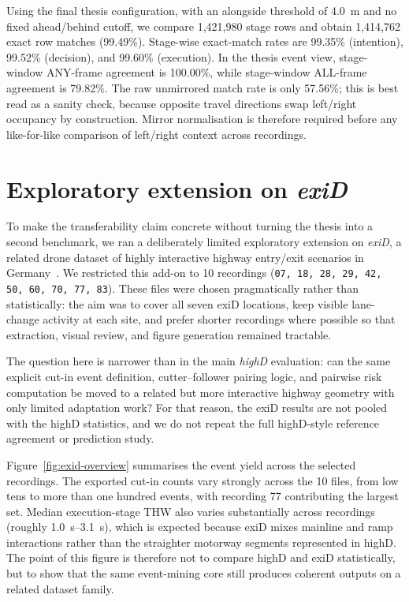 \documentclass[12pt,a4paper,twoside,openright]{report}
\begin{document}
    Using the final thesis configuration, with an alongside threshold of \SI{4.0}{\meter} and no fixed ahead/behind cutoff, we compare 1,421,980 stage rows and obtain 1,414,762 exact row matches (99.49\%). Stage-wise exact-match rates are 99.35\% (intention), 99.52\% (decision), and 99.60\% (execution). In the thesis event view, stage-window ANY-frame agreement is 100.00\%, while stage-window ALL-frame agreement is 79.82\%. The raw unmirrored match rate is only 57.56\%; this is best read as a sanity check, because opposite travel directions swap left/right occupancy by construction. Mirror normalisation is therefore required before any like-for-like comparison of left/right context across recordings.
    \section{Exploratory extension on \textit{exiD}}
    \label{sec:exid-exploratory}
    To make the transferability claim concrete without turning the thesis into a second benchmark, we ran a deliberately limited exploratory extension on \textit{exiD}, a related drone dataset of highly interactive highway entry/exit scenarios in Germany~\cite{moers2022exid}. We restricted this add-on to 10 recordings (\texttt{07, 18, 28, 29, 42, 50, 60, 70, 77, 83}). These files were chosen pragmatically rather than statistically: the aim was to cover all seven exiD locations, keep visible lane-change activity at each site, and prefer shorter recordings where possible so that extraction, visual review, and figure generation remained tractable.

    The question here is narrower than in the main \textit{highD} evaluation: can the same explicit cut-in event definition, cutter--follower pairing logic, and pairwise risk computation be moved to a related but more interactive highway geometry with only limited adaptation work? For that reason, the exiD results are not pooled with the highD statistics, and we do not repeat the full highD-style reference agreement or prediction study.

    Figure~\ref{fig:exid-overview} summarises the event yield across the selected recordings. The exported cut-in counts vary strongly across the 10 files, from low tens to more than one hundred events, with recording 77 contributing the largest set. Median execution-stage THW also varies substantially across recordings (roughly \SIrange{1.0}{3.1}{\second}), which is expected because exiD mixes mainline and ramp interactions rather than the straighter motorway segments represented in highD. The point of this figure is therefore not to compare highD and exiD statistically, but to show that the same event-mining core still produces coherent outputs on a related dataset family.
\end{document}
